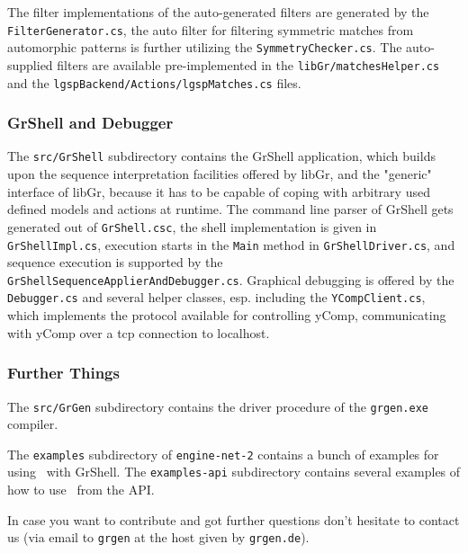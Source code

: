 The filter implementations of the auto-generated filters are generated by the \texttt{Filter\-Generator.cs}, the auto filter for filtering symmetric matches from automorphic patterns is further utilizing the \texttt{Symmetry\-Checker.cs}.
The auto-supplied filters are available pre-implemented in the \texttt{libGr/matches\-Helper.cs} and the \texttt{lgsp\-Backend/Actions/lgsp\-Matches.cs} files.

\subsubsection*{GrShell and Debugger}

The \texttt{src/GrShell} subdirectory contains the GrShell application, which builds upon the sequence interpretation facilities offered by libGr, and the "generic" interface of libGr, because it has to be capable of coping with arbitrary used defined models and actions at runtime.
The command line parser of GrShell gets generated out of \texttt{GrShell.csc}, the shell implementation is given in \texttt{GrShellImpl.cs}, execution starts in the \texttt{Main} method in \texttt{GrShell\-Driver.cs}, and sequence execution is supported by the \texttt{GrShell\-Sequence\-Applier\-And\-Debugger.cs}.
Graphical debugging is offered by the \texttt{Debugger.cs} and several helper classes, esp. including the \texttt{YCompClient.cs}, which implements the protocol available for controlling yComp, communicating with yComp over a tcp connection to localhost.

\subsubsection*{Further Things}

The \texttt{src/GrGen} subdirectory contains the driver procedure of the \texttt{grgen.exe} compiler.

The \texttt{examples} subdirectory of \texttt{engine-net-2} contains a bunch of examples for using \GrG~with GrShell.
The \texttt{examples-api} subdirectory contains several examples of how to use \GrG~from the API.

In case you want to contribute and got further questions don't hesitate to contact us 
(via email to \texttt{grgen} at the host given by \texttt{grgen.de}).


